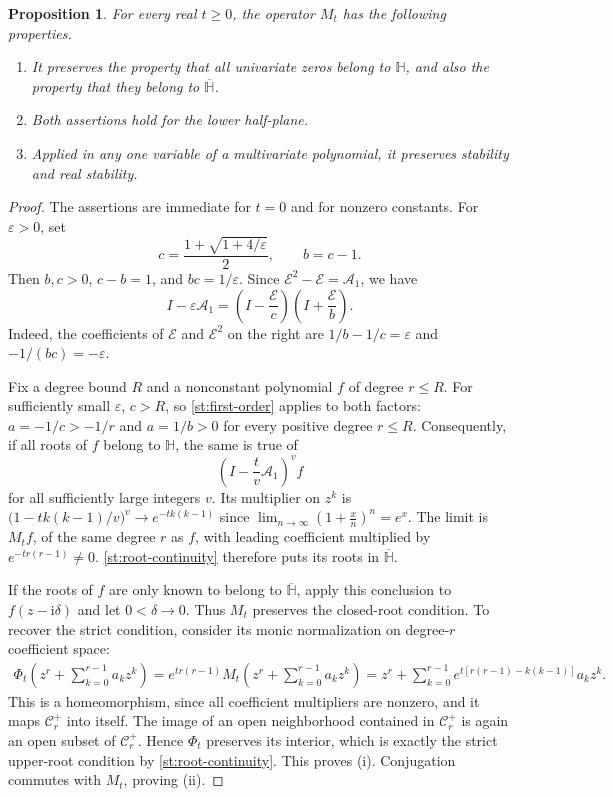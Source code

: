 \documentclass[reqno, 12pt]{article}
\numberwithin{equation}{section}
\newtheorem{proposition}[theorem]{Proposition}
\theoremstyle{definition}
\begin{document}
\begin{proposition}\label{st:multiplier-preservation}
For every real $t\geq0$, the operator $M_t$ has the following properties.
\begin{enumerate}
\item[(i)] It preserves the property that all univariate zeros belong to $\mathbb H$, and also the property that they belong to $\overline{\mathbb H}$.
\item[(ii)] Both assertions hold for the lower half-plane.
\item[(iii)] Applied in any one variable of a multivariate polynomial, it preserves stability and real stability.
\end{enumerate}
\end{proposition}
\begin{proof}
The assertions are immediate for $t=0$ and for nonzero constants.
For $\varepsilon>0$, set
\[
c=\frac{1+\sqrt{1+4/\varepsilon}}2,
\qquad b=c-1.
\]
Then $b,c>0$, $c-b=1$, and $bc=1/\varepsilon$.  Since
$\mathcal E^2-\mathcal E=\mathcal A_1$, we have
\begin{equation}\label{st:euler-factorization}
I-\varepsilon\mathcal A_1
=\left(I-\frac{\mathcal E}{c}\right)
 \left(I+\frac{\mathcal E}{b}\right).
\end{equation}
Indeed, the coefficients of $\mathcal E$ and $\mathcal E^2$
on the right are $1/b-1/c=\varepsilon$ and
$-1/(bc)=-\varepsilon$.

Fix a degree bound $R$ and a nonconstant polynomial $f$ of degree
$r\leq R$.  For sufficiently small $\varepsilon$,
$c>R$, so \cref{st:first-order} applies to both factors:
$a=-1/c>-1/r$ and $a=1/b>0$ for every positive degree $r\leq R$.
Consequently, if all roots of $f$ belong to $\mathbb H$, the same
is true of
\[
\left(I-\frac{t}{v}\mathcal A_1\right)^v f
\]
for all sufficiently large integers $v$.
Its multiplier on $z^k$ is
$\bigl(1-tk(k-1)/v\bigr)^v\to e^{-tk(k-1)}$ since $\lim_{n\rightarrow \infty} \left(1+\frac{x}{n}\right)^n=e^{x}$.
The limit is $M_tf$, of the same degree $r$ as $f$, with leading
coefficient multiplied by $e^{-tr(r-1)}\ne0$.
\cref{st:root-continuity} therefore puts its roots in
$\overline{\mathbb H}$.

If the roots of $f$ are only known to belong to
$\overline{\mathbb H}$, apply this conclusion to
$f(z-\mathrm i\delta)$ and let $0<\delta\rightarrow 0$.
Thus $M_t$ preserves the closed-root condition.
To recover the strict condition, consider its monic normalization
on degree-$r$ coefficient space:
\begin{align*}
\Phi_t\left(z^r+\sum_{k=0}^{r-1}a_kz^k\right)
=e^{tr(r-1)}M_t\left(z^r+\sum_{k=0}^{r-1}a_kz^k\right)=z^r+\sum_{k=0}^{r-1}e^{t[r(r-1)-k(k-1)]}a_kz^k.
\end{align*}
This is a homeomorphism, since all coefficient multipliers are
nonzero, and it maps $\mathcal C_r^+$ into itself.  The image of
an open neighborhood contained in $\mathcal C_r^+$ is again an
open subset of $\mathcal C_r^+$.  Hence $\Phi_t$ preserves its
interior, which is exactly the strict upper-root condition by \cref{st:root-continuity}.  This proves \textup{(i)}.
Conjugation commutes with $M_t$, proving \textup{(ii)}.


\end{proof}
\end{document}
